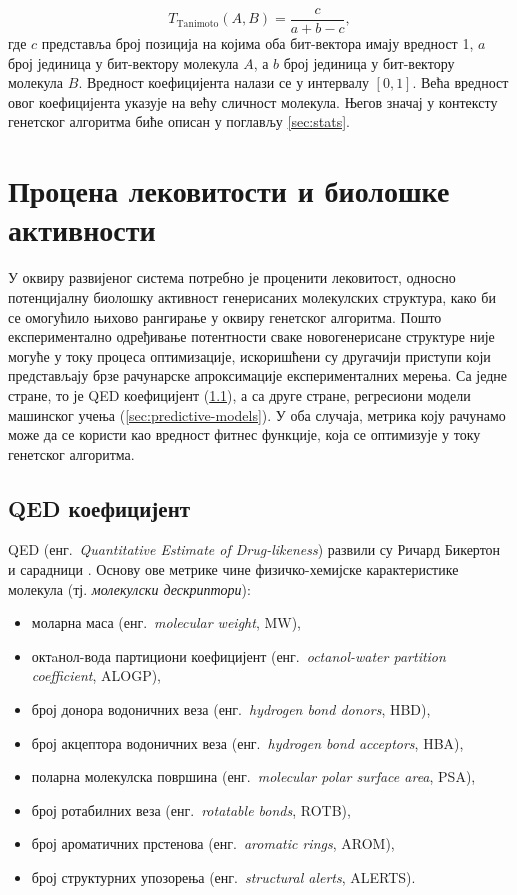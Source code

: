 \documentclass[12pt,oneside]{memoir}
\begin{document}
\[
T_{\mathrm{Tanimoto}}(A,B)
=\frac{c}{a+b-c},
\]
где $c$ представља број позиција на којима оба бит-вектора имају вредност
1, $a$ број јединица у бит-вектору молекула $A$, а $b$ број јединица у бит-вектору молекула $B$.
Вредност коефицијента налази се у интервалу
$[0,1]$. Већа вредност овог коефицијента указује на већу сличност молекула.
Његов значај у контексту генетског алгоритма биће описан у поглављу \ref{sec:stats}.


\chapter{Процена лековитости и биолошке активности}
\label{chp:models}

У оквиру развијеног система потребно је проценити лековитост, односно потенцијалну биолошку 
активност генерисаних молекулских структура, како би се омогућило њихово 
рангирање у оквиру генетског алгоритма. Пошто експериментално одређивање 
потентности сваке новогенерисане структуре није могуће у току процеса 
оптимизације, искоришћени су другачији приступи који представљају брзе 
рачунарске апроксимације експерименталних мерења. Са једне стране, то је
QED коефицијент (\ref{sec:qed}), а са друге стране, 
регресиони модели машинског учења (\ref{sec:predictive-models}).
У оба случаја, метрика коју рачунамо може да се користи као вредност
фитнес функције, која се оптимизује у току генетског алгоритма.

\section{QED коефицијент}
\label{sec:qed}

QED (енг.\ \textit{Quantitative Estimate of Drug-likeness}) развили су Ричард Бикертон и сарадници \cite{Bickerton2012}.
Основу ове метрике чине физичко-хемијске карактеристике молекула (тј. \textit{молекулски дескриптори}):

\begin{itemize}
  \item моларна маса (енг.\ \textit{molecular weight}, MW),
  \item октaнол-вода партициони коефицијент (енг.\ \textit{octanol-water partition coefficient}, ALOGP),
  \item број донора водоничних веза (енг.\ \textit{hydrogen bond donors}, HBD),
  \item број акцептора водоничних веза (енг.\ \textit{hydrogen bond acceptors}, HBA),
  \item поларна молекулска површина (енг.\ \textit{molecular polar surface area}, PSA),
  \item број ротабилних веза (енг.\ \textit{rotatable bonds}, ROTB),
  \item број ароматичних прстенова (енг.\ \textit{aromatic rings}, AROM),
  \item број структурних упозорења (енг.\ \textit{structural alerts}, ALERTS).
\end{itemize}
\end{document}
